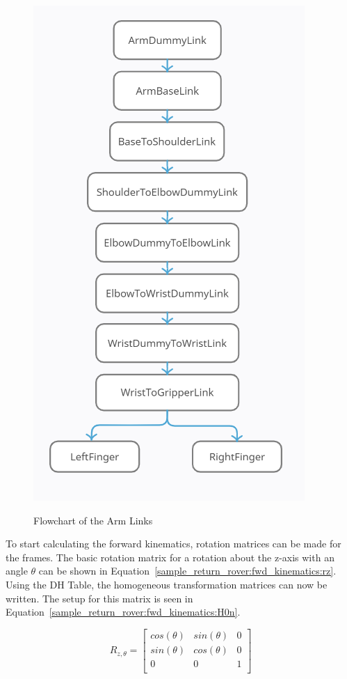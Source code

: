 \begin{figure}[H]
	\centering
	\includegraphics[scale=1.2]{sections/robot-design/images/arm_link_diagram.png}
	\label{sample_return_rover:robot_design:arm_diagram}
	\caption{Flowchart of the Arm Links}
\end{figure}
\newpage
To start calculating the forward kinematics, rotation matrices can be made for the frames. The basic rotation matrix for a rotation about the z-axis with an angle $\theta$ can be shown in Equation~\ref{sample_return_rover:fwd_kinematics:rz}. Using the DH Table, the homogeneous transformation matrices can now be written. The setup for this matrix is seen in Equation~\ref{sample_return_rover:fwd_kinematics:H0n}.

\begin{equation}
	R_{z, \theta} = \left[\begin{array}{ccc}
		cos(\theta) & sin(\theta) & 0 \\
		sin(\theta) & cos(\theta) & 0 \\
		0 & 0 & 1 \\
	\end{array}\right]
\label{sample_return_rover:fwd_kinematics:rz}	
\end{equation}

